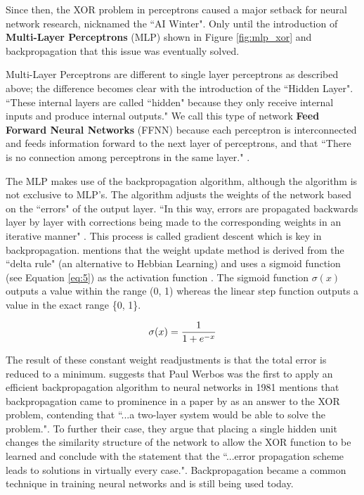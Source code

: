 \documentclass[report, 11pt, oneside]{dissertation}
\begin{document}
Since then, the XOR problem in perceptrons caused a major setback for neural network research, nicknamed the ``AI Winter". Only until the introduction of \textbf{Multi-Layer Perceptrons} (MLP) shown in Figure \ref{fig:mlp_xor} and backpropagation that this issue was eventually solved.

Multi-Layer Perceptrons are different to single layer perceptrons as described above; the difference becomes clear with the introduction of the ``Hidden Layer". ``These internal layers are called ``hidden" because they only receive internal inputs and produce internal outputs." \citep[142]{Patterson:1998:ANN:521611} We call this type of network \textbf{Feed Forward Neural Networks} (FFNN) because each perceptron is interconnected and feeds information forward to the next layer of perceptrons, and that ``There is no connection among perceptrons in the same layer." \citep{Roberts:2017:Online}. 

The MLP makes use of the backpropagation algorithm, although the algorithm is not exclusive to MLP's. The algorithm adjusts the weights of the network based on the ``errors" of the output layer. ``In this way, errors are propagated backwards layer by layer with corrections being made to the corresponding weights in an iterative manner" \citep{Patterson:1998:ANN:521611}. This process is called gradient descent which is key in backpropagation. \citeauthor{Ertel:2011:IAI:1971988} mentions that the weight update method is derived from the ``delta rule" (an alternative to Hebbian Learning) and uses a sigmoid function (see Equation \ref{eq:5}) as the activation function \citeyearpar[246]{Ertel:2011:IAI:1971988}. The sigmoid function $ \sigma(x) $ outputs a value within the range (0, 1) whereas the linear step function outputs a value in the exact range \{0, 1\}.

\begin{equation} \label{eq:5}
	\sigma(x) = \large\frac{1}{1 + e^{-x}} 
\end{equation}

The result of these constant weight readjustments is that the total error is reduced to a minimum. \citeauthor{Schmidhuber:2014cz} suggests that Paul Werbos was the first to apply an efficient backpropagation algorithm to neural networks in 1981 \citeyearpar[11]{Schmidhuber:2014cz} \citep[141]{Bishop:1995:NNP:525960} mentions that backpropagation came to prominence in a paper by \citep[2]{Rumelhart:1986:LIR:104279.104293} as an answer to the XOR problem, contending that ``...a two-layer system would be able to solve the problem.". To further their case, they argue that placing a single hidden unit changes the similarity structure of the network to allow the XOR function to be learned \citep[3]{Rumelhart:1986:LIR:104279.104293} and conclude with the statement that the ``...error propagation scheme leads to solutions in virtually every case."\citep[33]{Rumelhart:1986:LIR:104279.104293}.
Backpropagation became a common technique in training neural networks and is still being used today.
\end{document}
